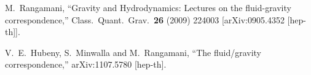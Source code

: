 \documentclass[12pt,notitlepage]{article}
\begin{document}
\begin{thebibliography}{99.}
  
  
  






 
  M.~Rangamani,
  ``Gravity and Hydrodynamics: Lectures on the fluid-gravity correspondence,''
  Class.\ Quant.\ Grav.\  {\bf 26} (2009) 224003
  [arXiv:0905.4352 [hep-th]].
 
 
  V.~E.~Hubeny, S.~Minwalla and M.~Rangamani,
  ``The fluid/gravity correspondence,''
  arXiv:1107.5780 [hep-th].
  
 
  
 \end{thebibliography}




%
\end{document}
